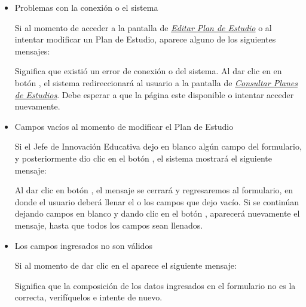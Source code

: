 \begin{itemize}
	\item Problemas con la conexión o el sistema
	
	Si al momento de acceder a la pantalla de \hyperlink{editarPE}{\textit{Editar Plan de Estudio}} o al intentar modificar un Plan de Estudio, aparece alguno de los siguientes mensajes:
	
	
	Significa que existió un error de conexión o del sistema. Al dar clic en en botón  , el sistema redireccionará al usuario a la pantalla de \hyperlink{consultarPE}{\textit{Consultar Planes de Estudios}}. Debe esperar a que la página este disponible o intentar acceder nuevamente.
	
	\item Campos vacíos al momento de modificar el Plan de Estudio
	
	Si el Jefe de Innovación Educativa dejo en blanco algún campo del formulario, y posteriormente dio clic en el botón  , el sistema mostrará el siguiente mensaje:
	
	
	Al dar clic en botón  , el mensaje se cerrará y regresaremos al formulario, en donde el usuario deberá llenar el o los campos que dejo vacío. Si se continúan dejando campos en blanco y dando clic en el botón  , aparecerá nuevamente el mensaje, hasta que todos los campos sean llenados.
	
	\item Los campos ingresados no son válidos
	
	Si al momento de dar clic en el  aparece el siguiente mensaje:
	
	Significa que la composición de los datos ingresados en el formulario no es la correcta, verifíquelos e intente de nuevo.
	
\end{itemize}
